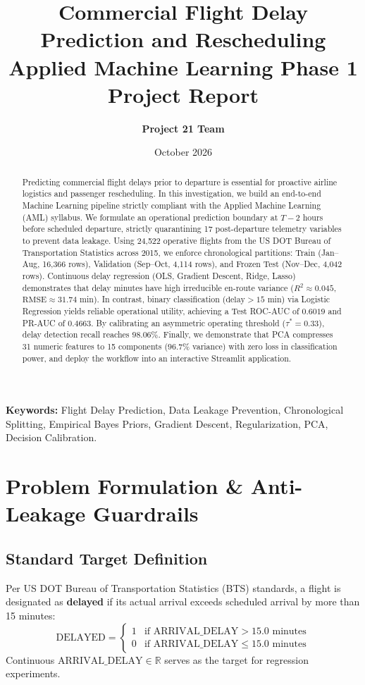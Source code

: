 \documentclass[11pt,a4paper]{article}
\title{\textbf{Commercial Flight Delay Prediction and Rescheduling}\\[0.5ex]
\large Applied Machine Learning Phase 1 Project Report}
\author{\textbf{Project 21 Team}}
\date{October 2026}
\begin{document}
\maketitle

\begin{abstract}
Predicting commercial flight delays prior to departure is essential for proactive airline logistics and passenger rescheduling. In this investigation, we build an end-to-end Machine Learning pipeline strictly compliant with the Applied Machine Learning (AML) syllabus. We formulate an operational prediction boundary at $T - 2$ hours before scheduled departure, strictly quarantining 17 post-departure telemetry variables to prevent data leakage. Using 24,522 operative flights from the US DOT Bureau of Transportation Statistics across 2015, we enforce chronological partitions: Train (Jan--Aug, 16,366 rows), Validation (Sep--Oct, 4,114 rows), and Frozen Test (Nov--Dec, 4,042 rows). Continuous delay regression (OLS, Gradient Descent, Ridge, Lasso) demonstrates that delay minutes have high irreducible en-route variance ($R^2 \approx 0.045$, $\text{RMSE} \approx 31.74$ min). In contrast, binary classification ($\text{delay} > 15$ min) via Logistic Regression yields reliable operational utility, achieving a Test ROC-AUC of $0.6019$ and PR-AUC of $0.4663$. By calibrating an asymmetric operating threshold ($\tau^* = 0.33$), delay detection recall reaches $98.06\%$. Finally, we demonstrate that PCA compresses 31 numeric features to 15 components ($96.7\%$ variance) with zero loss in classification power, and deploy the workflow into an interactive Streamlit application.
\end{abstract}

\textbf{Keywords:} Flight Delay Prediction, Data Leakage Prevention, Chronological Splitting, Empirical Bayes Priors, Gradient Descent, Regularization, PCA, Decision Calibration.

\section{Problem Formulation \& Anti-Leakage Guardrails}

\subsection{Standard Target Definition}
Per US DOT Bureau of Transportation Statistics (BTS) standards, a flight is designated as \textbf{delayed} if its actual arrival exceeds scheduled arrival by more than 15 minutes:
\begin{equation}
    \text{DELAYED} = \begin{cases} 
        1 & \text{if } \text{ARRIVAL\_DELAY} > 15.0 \text{ minutes} \\ 
        0 & \text{if } \text{ARRIVAL\_DELAY} \le 15.0 \text{ minutes} 
    \end{cases}
\end{equation}
Continuous $\text{ARRIVAL\_DELAY} \in \mathbb{R}$ serves as the target for regression experiments.
\end{document}

